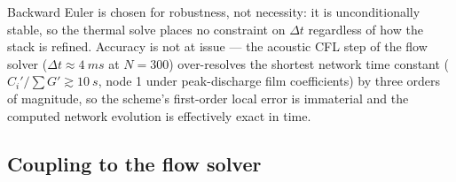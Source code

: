 \documentclass[11pt]{article}
\begin{document}
Backward Euler is chosen for robustness, not necessity: it is
unconditionally stable, so the thermal solve places no constraint on
$\Delta t$ regardless of how the stack is refined. Accuracy is not at
issue --- the acoustic CFL step of the flow solver
($\Delta t \approx \SI{4}{ms}$ at $N = 300$) over-resolves the
shortest network time constant ($C_i'/\sum G' \gtrsim \SI{10}{s}$,
node 1 under peak-discharge film coefficients) by three orders of
magnitude, so the scheme's first-order local error is immaterial and
the computed network evolution is effectively exact in time.

\subsection{Coupling to the flow solver}
\label{sec:thermal-coupling}
\end{document}
